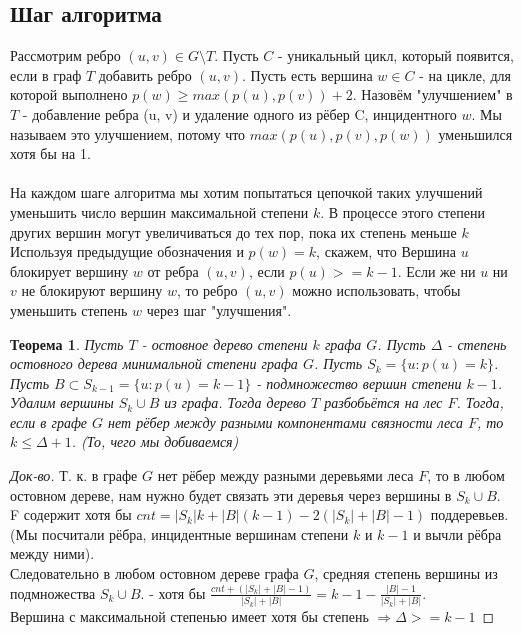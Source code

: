 \documentclass[a4paper, 12pt]{article}
\newtheorem{theorem}{Теорема}
\begin{document}
\subsection{Шаг алгоритма}
Рассмотрим ребро $(u, v) \in G \setminus T$. Пусть $C$ - уникальный цикл, который появится, если в граф $T$ добавить ребро $(u, v)$. Пусть есть вершина $w \in C$ - на цикле, для которой выполнено $p(w) \geqslant max(p(u), p(v))+ 2$. Назовём "улучшением" в $T$ - добавление ребра (u, v) и удаление одного из рёбер C, инцидентного $w$. Мы называем это улучшением, потому что $max(p(u), p(v), p(w))$ уменьшился хотя бы на 1.\\
\\
На каждом шаге алгоритма мы хотим попытаться цепочкой таких улучшений уменьшить число вершин максимальной степени $k$. В процессе этого степени других вершин могут увеличиваться до тех пор, пока их степень меньше $k$\\

Используя предыдущие обозначения и $p(w) = k$, скажем, что Вершина $u$ блокирует вершину $w$ от ребра $(u, v)$, если $p(u) >= k - 1$. Если же ни $u$ ни $v$ не блокируют вершину $w$, то ребро $(u, v)$ можно использовать, чтобы уменьшить степень $w$ через шаг "улучшения".

\begin{theorem}
Пусть $T$ - остовное дерево степени $k$ графа $G$. Пусть $\Delta$ - степень остовного дерева минимальной степени графа $G$. Пусть $S_k = \{u : p(u) = k\}$. Пусть $B \subset S_{k - 1} = \{u : p(u) = k - 1\}$ - подмножество вершин степени $k - 1$. Удалим вершины $S_k \cup B$ из графа. Тогда дерево $T$ разбобьётся на лес $F$. Тогда, если в графе $G$ нет рёбер между разными компонентами связности леса $F$, то $k \leqslant \Delta + 1$. (То, чего мы добиваемся)
\end{theorem}

\begin{proof}[Док-во]
Т. к. в графе $G$ нет рёбер между разными деревьями леса $F$, то в любом остовном дереве, нам нужно будет связать эти деревья через вершины в $S_k \cup B$.\\
F содержит хотя бы $cnt = |S_k|k + |B|(k-1) - 2(|S_k| + |B| - 1)$ поддеревьев. (Мы посчитали рёбра, инцидентные вершинам степени $k$ и $k - 1$ и вычли рёбра между ними).\\
Следовательно в любом остовном дереве графа $G$, средняя степень вершины из подмножества $S_k \cup B$. - хотя бы $\frac{cnt + (|S_k| + |B| - 1)}{|S_k| + |B|}  = k - 1 - \frac{|B| - 1}{|S_k| + |B|}$.\\
Вершина с максимальной степенью имеет хотя бы степень $\Rightarrow \Delta >= k - 1$

\end{proof}
\end{document}

